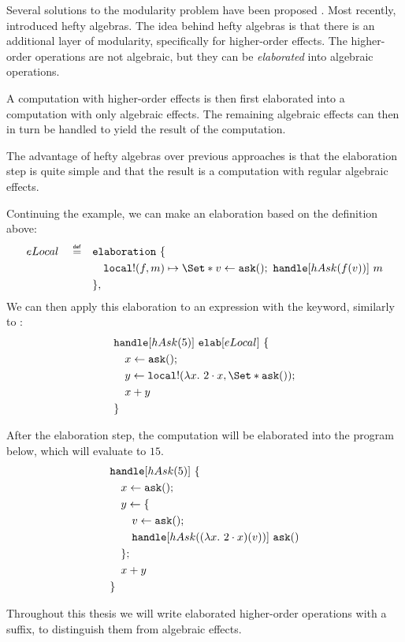 
Several solutions to the modularity problem have been proposed \autocite{wu_effect_2014,oh_latent_2021}. Most recently, \textcite{bach_poulsen_hefty_2023} introduced hefty algebras. The idea behind hefty algebras is that there is an additional layer of modularity, specifically for higher-order effects. The higher-order operations are not algebraic, but they can be \emph{elaborated} into algebraic operations.

A computation with higher-order effects is then first elaborated into a computation with only algebraic effects. The remaining algebraic effects can then in turn be handled to yield the result of the computation.

The advantage of hefty algebras over previous approaches is that the elaboration step is quite simple and that the result is a computation with regular algebraic effects.

Continuing the \olocal example, we can make an elaboration based on the definition above:
\begin{align*}
    eLocal \quad\defeq\quad
        &\elaboration\ \{ \\
        &\quad\olocal!(f, m) \mapsto \S{v \gets \oask()\seq \handle[hAsk(f(v))]\ m }\\
        &\},
\end{align*}
We can then apply this elaboration to an expression with the \elab keyword, similarly to \handle:
\begin{align*}
    &\handle[hAsk(5)]\ \elab[eLocal]\ \{ \\
    &\quad x \gets \oask();\\
    &\quad y \gets \olocal!(\lambda x.\ 2\cdot x, \S{ \oask() });\\
    &\quad x + y \\
    &\}
\end{align*}

After the elaboration step, the computation will be elaborated into the program below, which will evaluate to $15$.
\begin{align*}
    &\text{\texttt{handle}}[hAsk(5)]\ \{ \\
    &\quad x \gets \mathtt{ask}();\\
    &\quad y \gets \{\\
    &\quad\quad v \gets \mathtt{ask}();\\
    &\quad\quad \text{\texttt{handle}}[hAsk((\lambda x.\ 2\cdot x)(v))]\ \mathtt{ask}()\\
    &\quad\};\\
    &\quad x + y \\
    &\}
\end{align*}

Throughout this thesis we will write elaborated higher-order operations with a \code{!} suffix, to distinguish them from algebraic effects.

